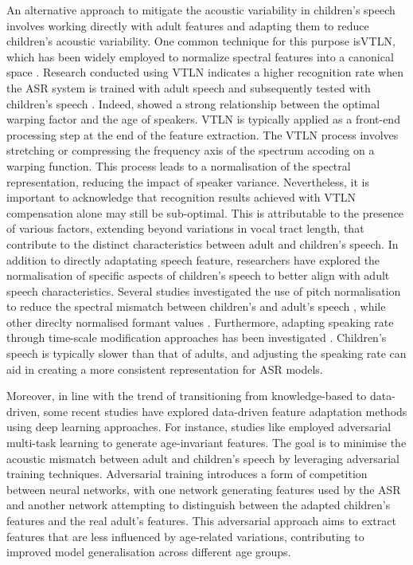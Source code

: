 An alternative approach to mitigate the acoustic variability in children's speech involves working directly with adult features and adapting them to reduce children's acoustic variability. One common technique for this purpose is\ac{VTLN}, which has been widely employed to normalize spectral features into a canonical space \cite{VTLN, VTLN2}. Research conducted using \ac{VTLN} indicates a higher recognition rate when the \ac{ASR} system is trained with adult speech and subsequently tested with children's speech \cite{claus2013survey,potamianos1997automatic}. Indeed, \cite{potamianos1997combining} showed a strong relationship between the optimal warping factor and the age of speakers. \ac{VTLN} is typically applied as a front-end processing step at the end of the feature extraction. The \ac{VTLN} process involves stretching or compressing the frequency axis of the spectrum accoding on a warping function. This process leads to a normalisation of the spectral representation, reducing the impact of speaker variance. Nevertheless, it is important to acknowledge that recognition results achieved with \ac{VTLN} compensation alone may still be sub-optimal. This is attributable to the presence of various factors, extending beyond variations in vocal tract length, that contribute to the distinct characteristics between adult and children's speech.
In addition to directly adaptating speech feature, researchers have explored the normalisation of specific aspects of children's speech to better align with adult speech characteristics. Several studies investigated the use of pitch normalisation to reduce the spectral mismatch between children's and adult's speech \cite{f0norm,pitchnorm,pitch_adapt_norm, shahnawazuddin2023gammatone},  while other direclty normalised formant values \cite{formant_norm,kumar2023effect}. Furthermore, adapting speaking rate through time-scale modification approaches has been investigated \cite{speaking_rate}. Children's speech is typically slower than that of adults, and adjusting the speaking rate can aid in creating a more consistent representation for \ac{ASR} models.

Moreover, in line with the trend of transitioning from knowledge-based to data-driven, some recent studies have explored data-driven feature adaptation methods using deep learning approaches. For instance, studies like \cite{adversarial-adapt1,adversarial-adapt2} employed adversarial multi-task learning to generate age-invariant features. The goal is to minimise the acoustic mismatch between adult and children's speech by leveraging adversarial training techniques. Adversarial training introduces a form of competition between neural networks, with one network generating features used by the \ac{ASR} and another network attempting to distinguish between the adapted children's features and the real adult's features. This adversarial approach aims to extract features that are less influenced by age-related variations, contributing to improved model generalisation across different age groups.

